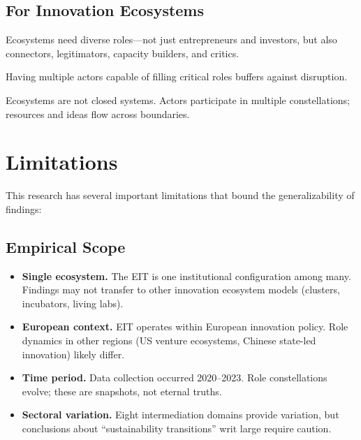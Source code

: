 \documentclass[../main.tex]{subfiles}
\begin{document}
\subsection{For Innovation Ecosystems}

\begin{description}[leftmargin=0.5cm, itemsep=0.3em]
\item[Functional coverage matters.] Ecosystems need diverse roles---not just entrepreneurs and investors, but also connectors, legitimators, capacity builders, and critics.

\item[Redundancy provides resilience.] Having multiple actors capable of filling critical roles buffers against disruption.

\item[Boundaries are permeable.] Ecosystems are not closed systems. Actors participate in multiple constellations; resources and ideas flow across boundaries.
\end{description}

\section{Limitations}

This research has several important limitations that bound the generalizability of findings:

\subsection{Empirical Scope}

\begin{itemize}[leftmargin=*, itemsep=0.3em]
\item \textbf{Single ecosystem.} The EIT is one institutional configuration among many. Findings may not transfer to other innovation ecosystem models (clusters, incubators, living labs).

\item \textbf{European context.} EIT operates within European innovation policy. Role dynamics in other regions (US venture ecosystems, Chinese state-led innovation) likely differ.

\item \textbf{Time period.} Data collection occurred 2020--2023. Role constellations evolve; these are snapshots, not eternal truths.

\item \textbf{Sectoral variation.} Eight intermediation domains provide variation, but conclusions about ``sustainability transitions'' writ large require caution.
\end{itemize}
\end{document}
